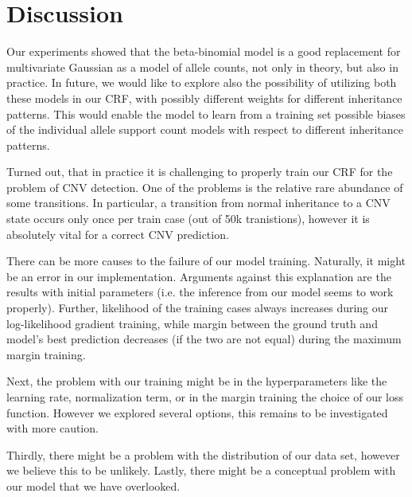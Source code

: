\section{Discussion}\label{sec:discussion}
Our experiments showed that the beta-binomial model is a good replacement for multivariate Gaussian as a model of allele counts, not only in theory, but also in practice. In future, we would like to explore also the possibility of utilizing both these models in our CRF, with possibly different weights for different inheritance patterns. This would enable the model to learn from a training set possible biases of the individual allele support count models with respect to different inheritance patterns.

Turned out, that in practice it is challenging to properly train our CRF for the problem of CNV detection. One of the problems is the relative rare abundance of some transitions. In particular, a transition from normal inheritance to a CNV state occurs only once per train case (out of \ntilde 50k tranistions), however it is absolutely vital for a correct CNV prediction.

There can be more causes to the failure of our model training. Naturally, it might be an error in our implementation. Arguments against this explanation are the results with initial parameters (i.e. the inference from our model seems to work properly). Further, likelihood of the training cases always increases during our log-likelihood gradient training, while margin between the ground truth and model's best prediction decreases (if the two are not equal) during the maximum margin training.

Next, the problem with our training might be in the hyperparameters like the learning rate, normalization term, or in the margin training the choice of our loss function. However we explored several options, this remains to be investigated with more caution.

Thirdly, there might be a problem with the distribution of our data set, however we believe this to be unlikely. Lastly, there might be a conceptual problem with our model that we have overlooked.
